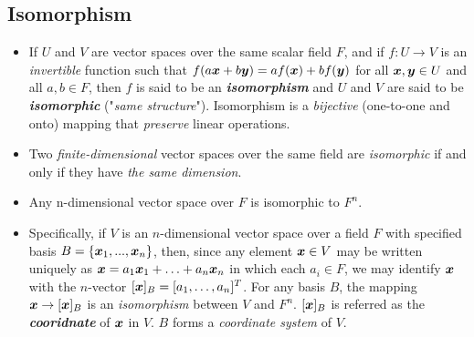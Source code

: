 \documentclass[11pt]{article}
\begin{document}
\subsection{Isomorphism}
\begin{itemize}
\item If $U$ and $V$ are vector spaces over the same scalar field $F$, and if $f: U \rightarrow V$ is an \emph{invertible} function such that $f(a\boldsymbol{x} + b\boldsymbol{y}) = af(\boldsymbol{x}) + b f(\boldsymbol{y})$ for all $\boldsymbol{x}, \boldsymbol{y} \in U$ and all $a, b \in F$, then $f$ is said to be an \emph{\textbf{isomorphism}} and $U$ and $V$ are said to be \emph{\textbf{isomorphic}} ("\emph{same structure}"). Isomorphism is a \emph{bijective} (one-to-one and onto) mapping that \emph{preserve} linear operations.

\item Two \emph{finite-dimensional} vector spaces over the same field are \emph{isomorphic} if and only if they have \emph{the same dimension}.

\item Any n-dimensional vector space over $F$ is isomorphic to $F^n$.

\item Specifically, if $V$ is an $n$-dimensional vector space over a field $F$ with specified basis $B = \{\boldsymbol{x}_1, . . . , \boldsymbol{x}_n\}$, then, since any element $\boldsymbol{x} \in V$ may be written uniquely as $\boldsymbol{x} = a_1\boldsymbol{x}_1 + \ldots + a_n\boldsymbol{x}_n$ in which each $a_i \in F$, we may identify $\boldsymbol{x}$ with the $n$-vector $[\boldsymbol{x}]_{B} = [a_1, \ldots, a_n]^T$. For any basis $B$, the mapping $\boldsymbol{x} \rightarrow [\boldsymbol{x}]_{B}$ is an \emph{isomorphism} between $V$ and $F^n$. $[\boldsymbol{x}]_{B}$ is referred as the \emph{\textbf{cooridnate}} of $\boldsymbol{x}$ in $V$. $B$ forms a \emph{coordinate system} of $V$.
\end{itemize}
\end{document}
